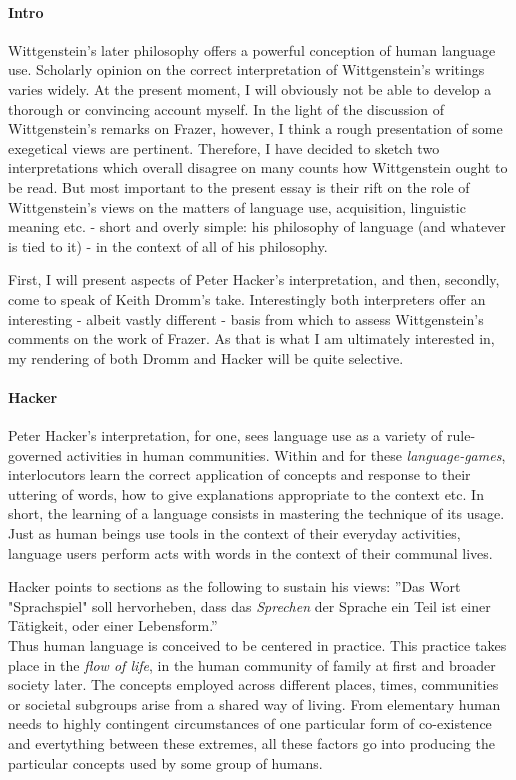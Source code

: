 \documentclass{article}
\begin{document}
\paragraph{Intro} Wittgenstein's later philosophy offers a powerful conception of human language use. Scholarly opinion on the correct interpretation of Wittgenstein's writings varies widely. At the present moment, I will obviously not be able to develop a thorough or convincing account myself. In the light of the discussion of Wittgenstein's remarks on Frazer, however, I think a rough presentation of some exegetical views are pertinent. Therefore, I have decided to sketch two interpretations which overall disagree on many counts how Wittgenstein ought to be read. But most important to the present essay is their rift on the role of Wittgenstein's views on the matters of language use, acquisition, linguistic meaning etc. - short and overly simple: his philosophy of language (and whatever is tied to it) - in the context of all of his philosophy.

First, I will present aspects of Peter Hacker's interpretation, and then, secondly, come to speak of Keith Dromm's take. Interestingly both interpreters offer an interesting - albeit vastly different - basis from which to assess Wittgenstein's comments on the work of Frazer. As that is what I am ultimately interested in, my rendering of both Dromm and Hacker will be quite selective.

\paragraph{Hacker} Peter Hacker's interpretation, for one, sees language use as a variety of rule-governed activities in human communities. Within and for these \textit{language-games}, interlocutors learn the correct application of concepts and response to their uttering of words, how to give explanations appropriate to the context etc. In short, the learning of a language consists in mastering the technique of its usage.
Just as human beings use tools in the context of their everyday activities, language users perform acts with words in the context of their communal lives. 

Hacker points to sections as the following to sustain his views:
''Das Wort "Sprachspiel" soll hervorheben, dass das \textit{Sprechen} der Sprache ein Teil ist einer T{\"a}tigkeit, oder einer Lebensform.''\\ %
Thus human language is conceived to be centered in practice. This practice takes place in the \textit{flow of life}, in the human community of family at first and broader society later. The concepts employed across different places, times, communities or societal subgroups arise from a shared way of living. From elementary human needs to highly contingent circumstances of one particular form of co-existence and evertything between these extremes, all these factors go into producing the particular concepts used by some group of humans.
\end{document}
